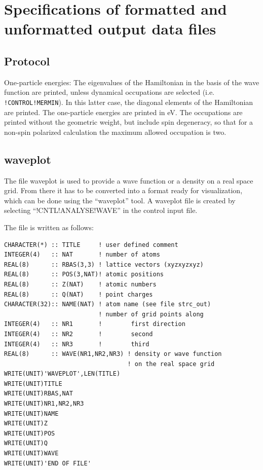 \documentclass[final,12pt,makeidx,DIV=calc]{article}
\begin{document}
{{{{{{%
\newpage
\section{Specifications of formatted and unformatted output data files}
\subsection{Protocol}
One-particle energies: The eigenvalues of the Hamiltonian in the basis
of the wave function are printed, unless dynamical occupations are
selected (i.e. \texttt{!CONTROL!MERMIN}). In this latter case, the
diagonal elements of the Hamiltonian are printed. The one-particle
energies are printed in eV. The occupations are printed without the
geometric weight, but include spin degeneracy, so that for a non-spin
polarized calculation the maximum allowed occupation is two.



\subsection{waveplot}
The file waveplot is used to provide a wave function or a density on
a real space grid. From there it has to be converted into a format
ready for visualization, which can be done using the ``waveplot'' tool.
A waveplot file is created by selecting ``!CNTL!ANALYSE!WAVE'' in the
control input file.


The file is written as follows:
\small{
\begin{verbatim}
CHARACTER(*) :: TITLE     ! user defined comment
INTEGER(4)   :: NAT       ! number of atoms
REAL(8)      :: RBAS(3,3) ! lattice vectors (xyzxyzxyz)
REAL(8)      :: POS(3,NAT)! atomic positions
REAL(8)      :: Z(NAT)    ! atomic numbers 
REAL(8)      :: Q(NAT)    ! point charges
CHARACTER(32):: NAME(NAT) ! atom name (see file strc_out)
                          ! number of grid points along 
INTEGER(4)   :: NR1       !        first direction
INTEGER(4)   :: NR2       !        second
INTEGER(4)   :: NR3       !        third
REAL(8)      :: WAVE(NR1,NR2,NR3) ! density or wave function 
                                  ! on the real space grid
WRITE(UNIT)'WAVEPLOT',LEN(TITLE)
WRITE(UNIT)TITLE
WRITE(UNIT)RBAS,NAT
WRITE(UNIT)NR1,NR2,NR3
WRITE(UNIT)NAME
WRITE(UNIT)Z
WRITE(UNIT)POS
WRITE(UNIT)Q
WRITE(UNIT)WAVE
WRITE(UNIT)'END OF FILE'
\end{verbatim}
}

}}}}}}
\end{document}
